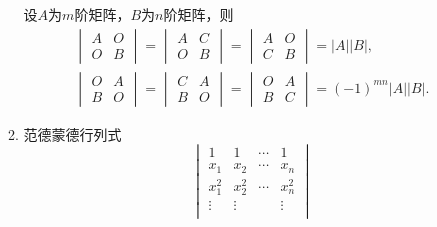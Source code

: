 \begin{enumerate}
\begin{enumerate}
                    设$A$为$m$阶矩阵，$B$为$n$阶矩阵，则
                    $$\begin{gathered}
                            \begin{vmatrix}
                                A & O \\
                                O & B
                            \end{vmatrix}=
                            \begin{vmatrix}
                                A & C \\
                                O & B
                            \end{vmatrix}=
                            \begin{vmatrix}
                                A & O \\
                                C & B
                            \end{vmatrix}=|A||B|, \\
                            \begin{vmatrix}
                                O & A \\
                                B & O
                            \end{vmatrix}=
                            \begin{vmatrix}
                                C & A \\
                                B & O
                            \end{vmatrix}=
                            \begin{vmatrix}
                                O & A \\
                                B & C
                            \end{vmatrix}=(-1)^{mn}|A||B|.
                        \end{gathered}$$
              \item 范德蒙德行列式
                    $$\begin{vmatrix}
                            1         & 1         & \cdots & 1         \\
                            x_1       & x_2       & \cdots & x_n       \\
                            x_1^2     & x_2^2     & \cdots & x_n^2     \\
                            \vdots    & \vdots    &        & \vdots    \\

\end{vmatrix}$$
\end{enumerate}
\end{enumerate}
